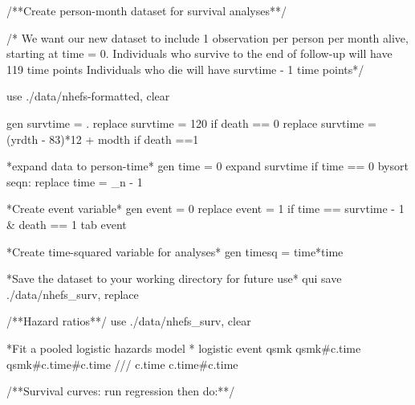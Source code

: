 \documentclass[
  10pt,
  a4paper,
]{book}
\newenvironment{Shaded}{\begin{snugshade}}{\end{snugshade}}
\newcommand{\CommentTok}[1]{\textcolor[rgb]{0.37,0.37,0.37}{#1}}
\newcommand{\DataTypeTok}[1]{\textcolor[rgb]{0.68,0.00,0.00}{#1}}
\newcommand{\KeywordTok}[1]{\textcolor[rgb]{0.00,0.46,0.62}{#1}}
\newcommand{\NormalTok}[1]{\textcolor[rgb]{0.00,0.46,0.62}{#1}}
\begin{document}
\begin{Shaded}
\begin{Highlighting}[]
\CommentTok{/**Create person{-}month dataset for survival analyses**/}

\CommentTok{/* We want our new dataset to include 1 observation per person }
\CommentTok{per month alive, starting at time = 0.}
\CommentTok{Individuals who survive to the end of follow{-}up will have }
\CommentTok{119 time points}
\CommentTok{Individuals who die will have survtime {-} 1 time points*/}

\KeywordTok{use}\NormalTok{ ./}\KeywordTok{data}\NormalTok{/nhefs{-}formatted, }\KeywordTok{clear}

\KeywordTok{gen}\NormalTok{ survtime = .}
\KeywordTok{replace}\NormalTok{ survtime = 120 }\KeywordTok{if}\NormalTok{ death == 0}
\KeywordTok{replace}\NormalTok{ survtime = (yrdth {-} 83)*12 + modth }\KeywordTok{if}\NormalTok{ death ==1}

\NormalTok{*expand }\KeywordTok{data}\NormalTok{ to person{-}time*}
\KeywordTok{gen}\NormalTok{ time = 0}
\NormalTok{expand survtime }\KeywordTok{if}\NormalTok{ time == 0}
\KeywordTok{bysort}\NormalTok{ seqn: }\KeywordTok{replace}\NormalTok{ time = }\DataTypeTok{\_n}\NormalTok{ {-} 1}

\NormalTok{*Create event }\KeywordTok{variable}\NormalTok{*}
\KeywordTok{gen}\NormalTok{ event = 0}
\KeywordTok{replace}\NormalTok{ event = 1 }\KeywordTok{if}\NormalTok{ time == survtime {-} 1 \& death == 1}
\KeywordTok{tab}\NormalTok{ event}

\NormalTok{*Create time{-}squared }\KeywordTok{variable} \KeywordTok{for}\NormalTok{ analyses*}
\KeywordTok{gen}\NormalTok{ timesq = time*time}

\NormalTok{*Save the dataset to your working directory }\KeywordTok{for}\NormalTok{ future }\KeywordTok{use}\NormalTok{*}
\KeywordTok{qui} \KeywordTok{save}\NormalTok{ ./}\KeywordTok{data}\NormalTok{/nhefs\_surv, }\KeywordTok{replace}

\CommentTok{/**Hazard ratios**/}
\KeywordTok{use}\NormalTok{ ./}\KeywordTok{data}\NormalTok{/nhefs\_surv, }\KeywordTok{clear}

\NormalTok{*Fit a pooled }\KeywordTok{logistic}\NormalTok{ hazards }\KeywordTok{model}\NormalTok{ *}
\KeywordTok{logistic}\NormalTok{ event qsmk qsmk\#c.time qsmk\#c.time\#c.time }\CommentTok{///}
\NormalTok{  c.time c.time\#c.time }

\CommentTok{/**Survival curves: run regression then do:**/}


\end{Highlighting}
\end{Shaded}
\end{document}
